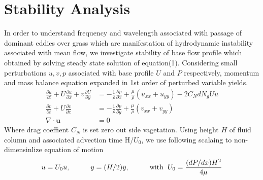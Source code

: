 \documentclass[aps,preprint,floatfix,prl]{revtex4-1}
\newcommand{\bu}{\mathbf{u}}
\newcommand{\del}{\partial}
\begin{document}
\section{Stability Analysis}
In order to understand frequency and wavelength associated with passage of dominant eddies over grass which are manifestation of hydrodynamic instability associated with mean flow, 
we investigate stability of base flow profile which obtained by solving steady state solution of equation(1). Considering small perturbations $u, v, p$  associated 
with base profile $U$ and $P$ respectively, momentum and mass balance equation expanded in 1st order of perturbed variable yields.
\begin{equation}
\begin{split}
 \frac{\del u}{\del t}+U\frac{\del u}{\del x}+v\frac{\del U}{\del y} &= -\frac{1}{\rho}\frac{\del p}{\del x}+\frac{\mu}{\rho}(u_{xx}+u_{yy})-2C_{N}dN_{g}Uu\\
 \frac{\del v}{\del  t}+ U\frac{\del v}{\del x} &= -\frac{1}{\rho}\frac{\del p}{\del y}+\frac{\mu}{\rho}(v_{xx}+v_{yy})\\
 \nabla\cdot \bu &= 0
\end{split}
\end{equation}
Where drag coeffient $C_N$ is set zero out side vagetation. Using height $H$ of fluid column and associated advection time H/$U_{0}$, we use following scalaing to non-dimensinlize equation 
of motion
   \[ u = U_{0}\bar{u},\hspace{1cm} y = (H/2)\bar{y}, \hspace{1cm} \text{with}\hspace{2mm} U_{0}=\frac{(dP/dx)H^2}{4\mu} \]
\end{document}
